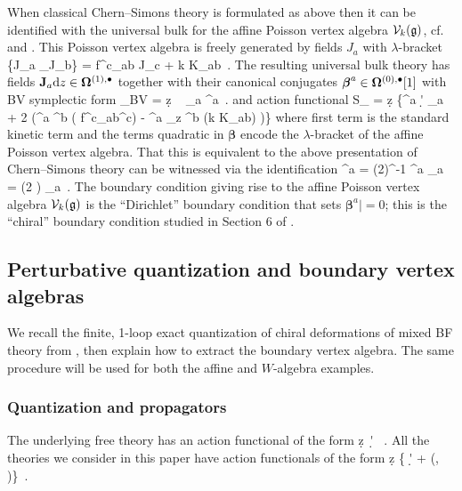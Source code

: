 \documentclass[11pt]{amsart}
\numberwithin{equation}{section}
\numberwithin{figure}{section}
\numberwithin{table}{section}
\begin{document}
When classical Chern--Simons theory is formulated as above then it can be identified with the universal bulk for the affine Poisson vertex algebra ${\mathcal V}_k(\mathfrak{g})$, cf. \cite[Sec.~4.2--4.3]{Butson:2016jys} and \cite[Sec.~3.1]{Khan:2025rah}.
This Poisson vertex algebra is freely generated by fields $J_a$ with $\lambda$-bracket
\be
	\{J_a {}_\lambda J_b\} = f^c_{ab} J_c + \lambda k K_{ab}~.
\ee
The resulting universal bulk theory has fields $\mathbf{J}_a \mathrm{d} z \in \mathbf{\Omega}^{(1),\bullet}$ together with their canonical conjugates $\boldsymbol{\beta}^a \in \mathbf{\Omega}^{(0),\bullet}[1]$ with BV symplectic form
\be
	\Omega_{BV} = \int \d z ~ \delta \bJ_a \delta \boldsymbol{\beta}^a~.
\ee
and action functional
\be
	S_{} = \int \d z \bigg\{\boldsymbol{\beta}^a \d' \bJ_a + 2 \pi \ii \big(\boldsymbol{\beta}^a \boldsymbol{\beta}^b ( f^c_{ab}\bJ^c) - \boldsymbol{\beta}^a \partial_z \boldsymbol{\beta}^b (k K_{ab}) \big)\bigg\}
\ee
where first term is the standard kinetic term and the terms quadratic in $\boldsymbol{\beta}$ encode the $\lambda$-bracket of the affine Poisson vertex algebra.
That this is equivalent to the above presentation of Chern--Simons theory can be witnessed via the identification
\be
	\boldsymbol{\beta}^a = (2\pi \ii)^{-1} \bA^a \qquad \bJ_a = (2 \pi \ii) \bB_a~.
\ee
The boundary condition giving rise to the affine Poisson vertex algebra ${\mathcal V}_k(\mathfrak{g})$ is the \enquote{Dirichlet} boundary condition that sets $\boldsymbol{\beta}^a| = 0$; this is the \enquote{chiral} boundary condition studied in Section 6 of \cite{Gwilliam:2019cbp}.

\subsection{Perturbative quantization and boundary vertex algebras}\label{app:PerturbativeQuantization}
We recall the finite, 1-loop exact quantization of chiral deformations of mixed BF theory from \cite{Gwilliam:2019cbp}, then explain how to extract the boundary vertex algebra.
The same procedure will be used for both the affine and $W$-algebra examples.

\subsubsection{Quantization and propagators}
The underlying free theory has an action functional of the form
\be
	\int \d z~\bB \d' \bA~.
\ee
All the theories we consider in this paper have action functionals of the form
\be
	\int \d z \bigg\{ \bB \d' \bA + \CI(\bB, \bA)\bigg\}~.
\ee
\end{document}
